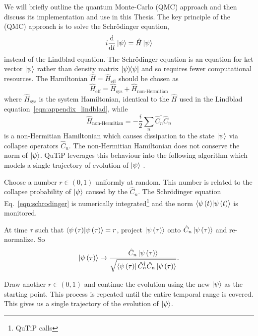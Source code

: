 We will briefly outline the quantum Monte-Carlo (QMC) approach and then discuss its implementation and use in this Thesis. The key principle of the (QMC) approach is to solve the Schr{\"o}dinger equation,
\begin{equation}\label{eqn:schrodinger}
i \frac{\mathrm{d}}{\mathrm{d}t} \ket{\psi} = \hat{H}\ket{\psi}
\end{equation}
instead of the Lindblad equation. The Schr{\"o}dinger equation is an equation for ket vector $\ket{\psi}$ rather than density matrix $\dyad{\psi}$ and so requires fewer computational resources. The Hamiltonian $\hat{H} = \hat{H}_{\text{eff}}$ should be chosen as
\begin{equation}
\hat{H}_{\text{eff}} = \hat{H}_{\text{sys}} + \hat{H}_{\text{non-Hermitian}}
\end{equation}
where $\hat{H}_{\text{sys}}$ is the system Hamiltonian, identical to the $\hat{H}$ used in the Lindblad equation~\ref{eqn:appendix_lindblad}, while 
\begin{equation}
\hat{H}_{\text{non-Hermitian}} = -\frac{i}{2} \sum_n \hat{C}_n^\dagger \hat{C}_n
\end{equation}
is a non-Hermitian Hamiltonian which causes dissipation to the state $\ket{\psi}$ via collapse operators $\hat{C}_n$. The non-Hermitian Hamiltonian does not conserve the norm of $\ket{\psi}$. QuTiP leverages this behaviour into the following algorithm which models a single trajectory of evolution of $\ket{\psi}$ \cite{Plenio1998, Dum1992, Dalibard1992, Daley2014}.

Choose a number $r \in \left(0, 1\right)$ uniformly at random. This number is related to the collapse probability of $\ket{\psi}$ caused by the $\hat{C}_n$. The Schr{\"o}dinger equation Eq.~\ref{eqn:schrodinger} is numerically integrated\footnote{QuTiP calls } and the norm $\ip{\psi\left(t\right)}$ is monitored.  

At time $\tau$ such that $\ip{\psi\left(\tau\right)} = r$, project $\ket{\psi\left(\tau\right)}$ onto $\hat{C}_n \ket{\psi\left(\tau\right)}$ and re-normalize. So
\begin{equation}\label{eqn:appendix_jump}
\ket{\psi\left(\tau\right)} \rightarrow \frac{\hat{C}_n \ket{\psi\left(\tau\right)}}{\sqrt{\bra{\psi\left(\tau\right)}\hat{C}_n^\dagger \hat{C}_n \ket{\psi\left(\tau\right)}}}.
\end{equation}

\noindent Draw another $r \in \left(0, 1\right)$ and continue the evolution using the new $\ket{\psi}$ as the starting point. This process is repeated until the entire temporal range is covered. This gives us a single trajectory of the evolution of $\ket{\psi}$. 

